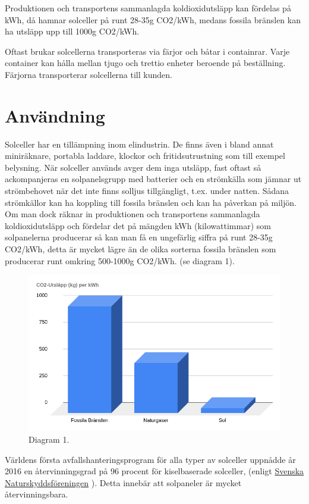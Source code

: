 \documentclass{article}
\begin{document}
Produktionen och transportens sammanlagda koldioxidutsläpp kan fördelas på kWh, då hamnar solceller på runt 28-35g CO2/kWh, medans fossila bränslen kan ha utsläpp upp till 1000g CO2/kWh.

Oftast brukar solcellerna transporteras via färjor och båtar i containrar. Varje container kan hålla mellan tjugo och trettio enheter beroende på beställning. Färjorna transporterar solcellerna till kunden.
\pagebreak
\section{Användning}
Solceller har en tillämpning inom elindustrin. De finns även i bland annat miniräknare, portabla laddare, klockor och fritidsutrustning som till exempel belysning. När solceller används avger dem inga utsläpp, fast oftast så ackompanjeras en solpanelsgrupp med batterier och en strömkälla som jämnar ut strömbehovet när det inte finns solljus tillgängligt, t.ex. under natten. Sådana strömkällor kan ha koppling till fossila bränslen och kan ha påverkan på miljön. 
Om man dock räknar in produktionen och transportens sammanlagda koldioxidutsläpp och fördelar det på mängden kWh (kilowattimmar) som solpanelerna producerar så kan man få en ungefärlig siffra på runt 28-35g CO2/kWh, detta är mycket lägre än de olika sorterna fossila bränslen som producerar runt omkring 500-1000g CO2/kWh. (se diagram 1).

\begin{figure}[h]
	\centering
	\includegraphics{diagram1}
\caption{Diagram 1.}
\label{fig:dig1}
\end{figure}

Världens första avfallshanteringsprogram för alla typer av solceller uppnådde år 2016 en återvinningsgrad på 96 procent för kiselbaserade solceller, (enligt \href{https://m.naturskyddsforeningen.se/faqsol}{Svenska Naturskyddsföreningen}
).\newline
Detta innebär att solpaneler är mycket återvinningsbara.
\end{document}
